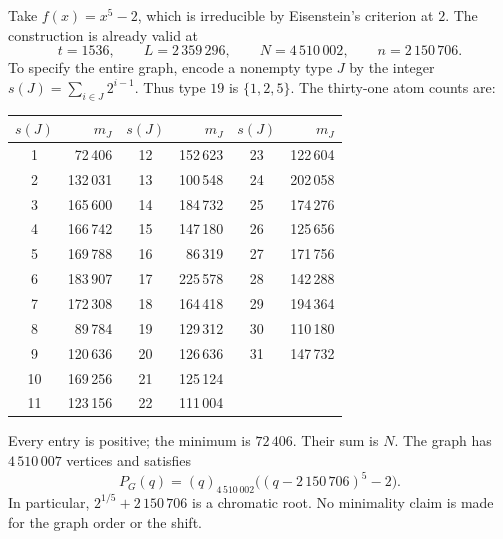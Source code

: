 \documentclass[11pt,a4paper]{article}
\theoremstyle{definition}
\newcommand{\fall}[2]{(#1)_{#2}}
\begin{document}
Take $f(x)=x^5-2$, which is irreducible by Eisenstein's criterion at $2$.
The construction is already valid at
\[
 t=1536,\qquad L=2\,359\,296,\qquad
 N=4\,510\,002,\qquad n=2\,150\,706.
\]
To specify the entire graph, encode a nonempty type $J$ by the integer
$s(J)=\sum_{i\in J}2^{i-1}$. Thus type $19$ is $\{1,2,5\}$.
The thirty-one atom counts are:
\begin{center}
\begin{tabular}{cr@{\qquad}cr@{\qquad}cr}
\toprule
$s(J)$ & $m_J$ & $s(J)$ & $m_J$ & $s(J)$ & $m_J$\\
\midrule
1 & 72\,406 & 12 & 152\,623 & 23 & 122\,604\\
2 & 132\,031 & 13 & 100\,548 & 24 & 202\,058\\
3 & 165\,600 & 14 & 184\,732 & 25 & 174\,276\\
4 & 166\,742 & 15 & 147\,180 & 26 & 125\,656\\
5 & 169\,788 & 16 & 86\,319 & 27 & 171\,756\\
6 & 183\,907 & 17 & 225\,578 & 28 & 142\,288\\
7 & 172\,308 & 18 & 164\,418 & 29 & 194\,364\\
8 & 89\,784 & 19 & 129\,312 & 30 & 110\,180\\
9 & 120\,636 & 20 & 126\,636 & 31 & 147\,732\\
10 & 169\,256 & 21 & 125\,124 &  & \\
11 & 123\,156 & 22 & 111\,004 &  & \\
\bottomrule
\end{tabular}
\end{center}
Every entry is positive; the minimum is $72\,406$.
Their sum is $N$. The graph has $4\,510\,007$ vertices and satisfies
\begin{equation}\label{eq:example}
 P_G(q)=\fall q{4\,510\,002}
       \bigl((q-2\,150\,706)^5-2\bigr).
\end{equation}
In particular, $2^{1/5}+2\,150\,706$ is a chromatic root.
No minimality claim is made for the graph order or the shift.
\end{document}
